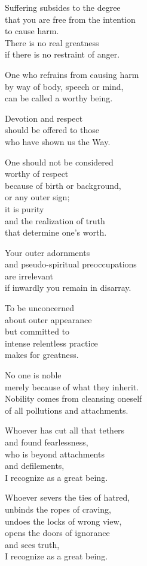 Suffering subsides to the degree\\
that you are free from the intention\\
to cause harm.\\
There is no real greatness\\
if there is no restraint of anger.


One who refrains from causing harm\\
by way of body, speech or mind,\\
can be called a worthy being.


Devotion and respect\\
should be offered to those\\
who have shown us the Way.


One should not be considered\\
worthy of respect\\
because of birth or background,\\
or any outer sign;\\
it is purity\\
and the realization of truth\\
that determine one's worth.


Your outer adornments\\
and pseudo-spiritual preoccupations\\
are irrelevant\\
if inwardly you remain in disarray.


To be unconcerned\\
about outer appearance\\
but committed to\\
intense relentless practice\\
makes for greatness.

No one is noble\\
merely because of what they inherit.\\
Nobility comes from cleansing oneself\\
of all pollutions and attachments.

Whoever has cut all that tethers\\
and found fearlessness,\\
who is beyond attachments\\
and defilements,\\
I recognize as a great being.


Whoever severs the ties of hatred,\\
unbinds the ropes of craving,\\
undoes the locks of wrong view,\\
opens the doors of ignorance\\
and sees truth,\\
I recognize as a great being.


